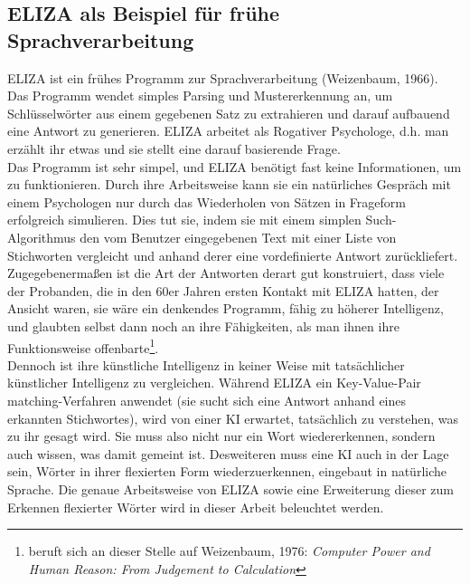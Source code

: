 \documentclass[12pt,twoside]{article}
\theoremstyle{plain}
\theoremstyle{definition}
\theoremstyle{remark}
\begin{document}
	\subsection{ELIZA als Beispiel für frühe Sprachverarbeitung}
	\label{ssec:eliza}
	ELIZA ist ein frühes Programm zur Sprachverarbeitung (Weizenbaum, 1966).
	Das Programm wendet simples Parsing und Mustererkennung an, um Schlüsselwörter aus einem gegebenen Satz zu extrahieren und darauf aufbauend eine Antwort zu generieren.
	ELIZA arbeitet als Rogativer Psychologe, d.h. man erzählt ihr etwas und sie stellt eine darauf basierende Frage.\\
	Das Programm ist sehr simpel, und ELIZA benötigt fast keine Informationen, um zu funktionieren.
	Durch ihre Arbeitsweise kann sie ein natürliches Gespräch mit einem Psychologen nur durch das Wiederholen von Sätzen in Frageform erfolgreich simulieren.
	Dies tut sie, indem sie mit einem simplen Such-Algorithmus den vom Benutzer eingegebenen Text mit einer Liste von Stichworten vergleicht und anhand derer eine vordefinierte Antwort zurückliefert.
	Zugegebenermaßen ist die Art der Antworten derart gut konstruiert, dass viele der Probanden, die in den 60er Jahren ersten Kontakt mit ELIZA hatten, der Ansicht waren, sie wäre ein denkendes Programm, fähig zu höherer Intelligenz, und glaubten selbst dann noch an ihre Fähigkeiten, als man ihnen ihre Funktionsweise offenbarte\footnote{\cite{Jur2009} beruft sich an dieser Stelle auf Weizenbaum, 1976: \textit{Computer Power and Human Reason: From Judgement to Calculation}}.\\
	Dennoch ist ihre künstliche Intelligenz in keiner Weise mit tatsächlicher künstlicher Intelligenz zu vergleichen.
	Während ELIZA ein Key-Value-Pair matching-Verfahren anwendet (sie sucht sich eine Antwort anhand eines erkannten Stichwortes), wird von einer KI erwartet, tatsächlich zu verstehen, was zu ihr gesagt wird.
	Sie muss also nicht nur ein Wort wiedererkennen, sondern auch wissen, was damit gemeint ist.
	Desweiteren muss eine KI auch in der Lage sein, Wörter in ihrer flexierten Form wiederzuerkennen, eingebaut in natürliche Sprache.
	Die genaue Arbeitsweise von ELIZA sowie eine Erweiterung dieser zum Erkennen flexierter Wörter wird in dieser Arbeit beleuchtet werden.
\end{document}
